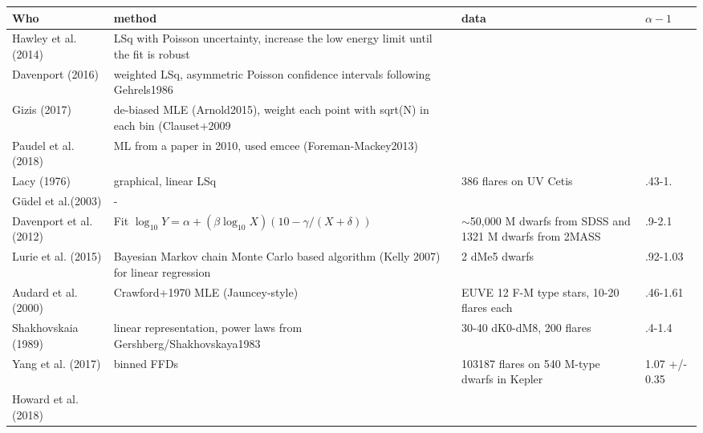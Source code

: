 
\begin{tabular}{lL{6cm}L{4cm}l}
\toprule
                      Who &                                                                                  method &                                                          data &      $\alpha-1$ \\
\midrule
  Hawley et al. (2014)    &    LSq with Poisson uncertainty, increase the low energy limit until the fit is robust  &                                                               &                 \\
  Davenport (2016)        &            weighted LSq, asymmetric Poisson confidence intervals following Gehrels1986  &                                                               &                 \\
  Gizis  (2017)           &    de-biased MLE (Arnold2015), weight each point with sqrt(N) in each bin (Clauset+2009 &                                                               &                 \\
  Paudel et al. (2018)    &                               ML from a paper in 2010, used emcee (Foreman-Mackey2013)  &                                                               &                 \\
  Lacy (1976)             &                                                                  graphical, linear LSq  &                                        386 flares on UV Cetis &         .43-1.  \\
  Güdel et al.(2003)      &      -                                                                                   &                                                               &                 \\
  Davenport et al. (2012) &              Fit $\log_{10} Y = \alpha + (\beta \log_{10} X)(10 -\gamma /(X+\delta) )$  &  $\sim$50,000 M dwarfs from SDSS and 1321 M dwarfs from 2MASS &          .9-2.1 \\
  Lurie et al. (2015)     &   Bayesian Markov chain Monte Carlo based algorithm (Kelly 2007) for linear regression  &                                                2 dMe5 dwarfs  &        .92-1.03 \\
  Audard et al. (2000)    &                                                      Crawford+1970 MLE (Jauncey-style)  &                    EUVE 12 F-M type stars, 10-20 flares each  &        .46-1.61 \\
  Shakhovskaia (1989)     &                      linear representation, power laws from Gershberg/Shakhovskaya1983  &                                     30-40 dK0-dM8, 200 flares &          .4-1.4 \\
  Yang et al. (2017)      &                                                                            binned FFDs  &                 103187 flares on 540 M-type dwarfs in Kepler  &   1.07 +/- 0.35 \\
  Howard et al. (2018)    &
\bottomrule
\end{tabular}
